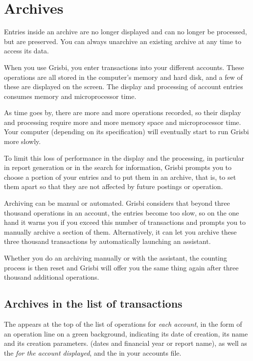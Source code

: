 \section{Archives\label{datamanagement-history}}


Entries inside an archive are no longer displayed and can no longer be processed, but are preserved. You can always unarchive an existing archive at any time to access its data. 

When you use Grisbi, you enter transactions into your different accounts. These operations are all stored in the computer's memory and hard disk, and a few of these are displayed on the screen. The display and processing of account entries consumes memory and microprocessor time.

As time goes by, there are more and more operations recorded, so their display and processing require more and more memory space and microprocessor time. Your computer (depending on its specification) will eventually start to run Grisbi more slowly. 

To limit this loss of performance in the display and the processing, in particular in report generation or in the search for information, Grisbi prompts you to choose a portion of your entries and to put them in an archive, that is, to set them apart so that they are not affected by future postings or operation.

Archiving can be manual or automated. Grisbi considers that beyond three thousand operations in an account, the entries become too slow, so on the one hand it warns you if you exceed this number of transactions and prompts you to manually archive a section of them. Alternatively, it can let you archive these three thousand transactions by automatically launching an assistant.

Whether you do an archiving manually or with the assistant, the counting process is then reset and Grisbi will offer you the same thing again after three thousand additional operations.



\subsection{Archives in the list of transactions\label{datamanagement-history-list}}

The  appears at the top of the list of operations for \emph{each account},  in the form of an operation line on a green{\couleur} background, indicating its date of creation, its name and its creation parameters. (dates and financial year or report name), as well as \ifIllustration the  \emph{for the account displayed}, and the  in your accounts file.

